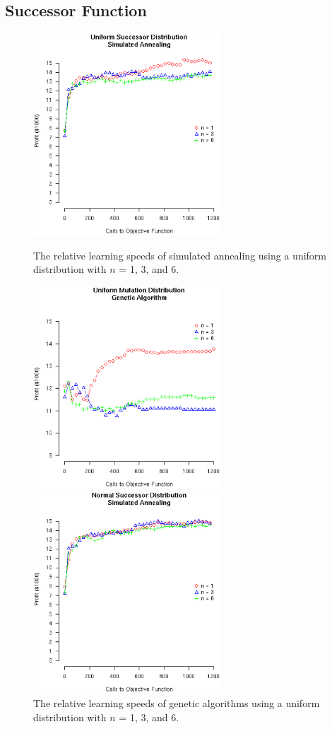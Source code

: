 \documentclass[12pt]{article}
\begin{document}
\subsection{Successor Function}
\begin{figure}[!ht]
  \begin{minipage}[b]{0.5\linewidth}
    \center
    \includegraphics[width=7.0cm]{SimUNIFORMDist.eps}
    \caption{The relative learning speeds of simulated annealing using a uniform
      distribution with $n$ = 1, 3, and 6.}
  \end{minipage}
\hspace{0.5cm} %
  \begin{minipage}[b]{0.5\linewidth}
    \center
    \includegraphics[width=7.0cm]{GenUNIFORMDist.eps}
    \caption{The relative learning speeds of genetic algorithms using a uniform
      distribution with $n$ = 1, 3, and 6.}
  \end{minipage}
  \begin{minipage}[b]{0.5\linewidth}
    \center
    \includegraphics[width=7.0cm]{SimNORMALDist.eps}

\end{minipage}
\end{figure}
\end{document}
